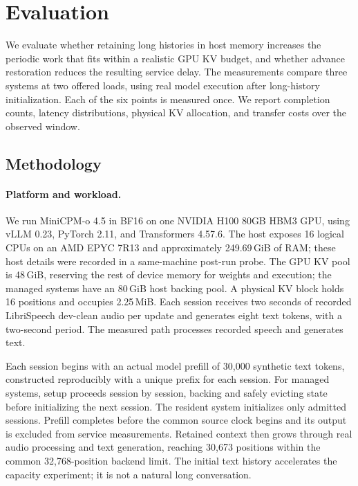 \section{Evaluation}
\label{sec:evaluation}

We evaluate whether retaining long histories in host memory increases the periodic work that fits within a realistic GPU KV budget, and whether advance restoration reduces the resulting service delay.
The measurements compare three systems at two offered loads, using real model execution after long-history initialization.
Each of the six points is measured once.
We report completion counts, latency distributions, physical KV allocation, and transfer costs over the observed window.

\subsection{Methodology}
\label{sec:methodology}

\paragraph{Platform and workload.}
We run MiniCPM-o 4.5 in BF16 on one NVIDIA H100 80GB HBM3 GPU, using vLLM 0.23, PyTorch 2.11, and Transformers 4.57.6.
The host exposes 16 logical CPUs on an AMD EPYC 7R13 and approximately 249.69\,GiB of RAM; these host details were recorded in a same-machine post-run probe.
The GPU KV pool is 48\,GiB, reserving the rest of device memory for weights and execution; the managed systems have an 80\,GiB host backing pool.
A physical KV block holds 16 positions and occupies 2.25\,MiB.
Each session receives two seconds of recorded LibriSpeech dev-clean audio per update and generates eight text tokens, with a two-second period.
The measured path processes recorded speech and generates text.

Each session begins with an actual model prefill of 30,000 synthetic text tokens, constructed reproducibly with a unique prefix for each session.
For managed systems, setup proceeds session by session, backing and safely evicting state before initializing the next session.
The resident system initializes only admitted sessions.
Prefill completes before the common source clock begins and its output is excluded from service measurements.
Retained context then grows through real audio processing and text generation, reaching 30,673 positions within the common 32,768-position backend limit.
The initial text history accelerates the capacity experiment; it is not a natural long conversation.

